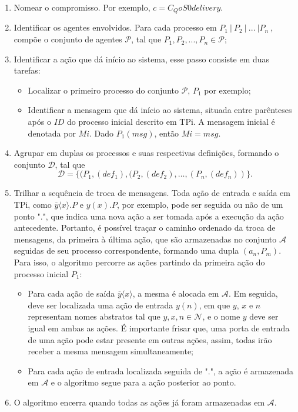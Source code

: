 \begin{enumerate}
	\item Nomear o compromisso. Por exemplo, $c = C_QoS0delivery$.
	\item Identificar os agentes envolvidos. Para cada processo em $P_{1}~|~P_{2}~|~...~|P_{n}~$, compõe o conjunto de agentes $\mathcal{P}$, tal que $P_{1}, P_{2}, ..., P_{n} \in \mathcal{P}$;
	\item Identificar a ação que dá início ao sistema, esse passo consiste em duas tarefas:
		\begin{itemize}
			\item Localizar o primeiro processo do conjunto $\mathcal{P}$, $P_{1}$ por exemplo;
			\item Identificar a mensagem que dá início ao sistema, situada entre parênteses após o $ID$ do processo inicial descrito em TPi. A mensagem inicial é denotada por $Mi$. Dado $P_{1}(msg)$, então $Mi = msg$.
		\end{itemize}
	\item Agrupar em duplas os processos e suas respectivas definições, formando o conjunto $\mathcal{D}$, tal que $$\mathcal{D} = \{(P_{1}, (def_{1}), (P_{2}, (def_{2}), \ldots, (P_{n}, (def_{n}))\}.$$
	\item Trilhar a sequência de troca de mensagens. Toda ação de entrada e saída em TPi, como $\overline{y}\langle x \rangle.P$ e $y(x).P$, por exemplo, pode ser seguida ou não de um ponto "$.$", que indica uma nova ação a ser tomada após a execução da ação antecedente. Portanto, é possível traçar o caminho ordenado da troca de mensagens, da primeira à última ação, que são armazenadas no conjunto $\mathcal{A}$ seguidas de seu processo correspondente, formando uma dupla $(a_{n}, P_{m})$. Para isso, o algoritmo percorre as ações partindo da primeira ação do processo inicial $P_{1}$:
		\begin{itemize}
			\item  Para cada ação de saída $\overline{y}\langle x \rangle$, a mesma é alocada em $\mathcal{A}$. Em seguida, deve ser localizada uma ação de entrada $y(n)$, em que $y$, $x$ e $n$ representam nomes abstratos tal que $y, x, n \in \mathcal{N}$, e o nome $y$ deve ser igual em ambas as ações. É importante frisar que, uma porta de entrada de uma ação pode estar presente em outras ações, assim, todas irão receber a mesma mensagem simultaneamente;
			\item Para cada ação de entrada localizada seguida de "$.$", a ação é armazenada em $\mathcal{A}$ e o algoritmo segue para a ação posterior ao ponto.
		\end{itemize}
	\item O algoritmo encerra quando todas as ações já foram armazenadas em $\mathcal{A}$.
\end{enumerate}

